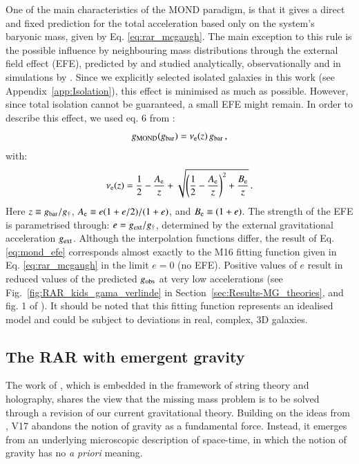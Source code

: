 \documentclass{aa}
\newcommand{\un}[1]{_{\rm #1}}
\begin{document}
One of the main characteristics of the MOND paradigm, is that it gives a direct and fixed prediction for the total acceleration based only on the system's baryonic mass, given by Eq. \ref{eq:rar_mcgaugh}. The main exception to this rule is the possible influence by neighbouring mass distributions through the external field effect (EFE), predicted by \cite{milgrom1983} and studied analytically, observationally and in simulations by \cite{banik2015,banik2020,chae2020}. Since we explicitly selected isolated galaxies in this work (see Appendix~\ref{app:Isolation}), this effect is minimised as much as possible. However, since total isolation cannot be guaranteed, a small EFE might remain. In order to describe this effect, we used eq. 6 from \cite{chae2020}:
\begin{equation}
g\un{MOND}(g\un{bar}) = \nu\un{e}(z) \, g\un{bar} \, ,
\end{equation}
with:
\begin{equation} \label{eq:mond_efe}
\nu\un{e}(z) = \frac{1}{2} - \frac{A\un{e}}{z} + \sqrt{\left( \frac{1}{2} - \frac{A\un{e}}{z} \right)^2 + \frac{B\un{e}}{z}} \, .
\end{equation}
Here $z \equiv g\un{bar}/g_\dagger$, $A\un{e} \equiv e(1+e/2)/(1+e)$, and $B\un{e} \equiv (1+e)$. The strength of the EFE is parametrised through: $e = g\un{ext}/g_\dagger$, determined by the external gravitational acceleration $g\un{ext}$. Although the interpolation functions differ, the result of Eq. \ref{eq:mond_efe} corresponds almost exactly to the M16 fitting function given in Eq. \ref{eq:rar_mcgaugh} in the limit $e=0$ (no EFE). Positive values of $e$ result in reduced values of the predicted $g\un{obs}$ at very low accelerations (see Fig.~\ref{fig:RAR_kids_gama_verlinde} in Section~\ref{sec:Results-MG_theories}, and fig. 1 of \citealp{chae2020}). It should be noted that this fitting function represents an idealised model and could be subject to deviations in real, complex, 3D galaxies.


\subsection{The RAR with emergent gravity}
\label{sec:EG}

The work of \citet[][V17 hereafter]{verlinde2017}, which is embedded in the framework of string theory and holography, shares the view that the missing mass problem is to be solved through a revision of our current gravitational theory. Building on the ideas from \cite{jacobson1995,jacobson2016,padmanabhan2010,verlinde2011,faulkner2015}, V17 abandons the notion of gravity as a fundamental force. Instead, it emerges from an underlying microscopic description of space-time, in which the notion of gravity has no \emph{a priori} meaning.
\end{document}
